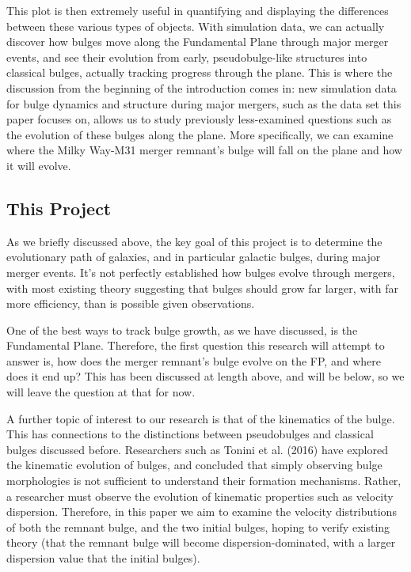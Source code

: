 \documentclass[iop]{emulateapj}
\begin{document}
This plot is then extremely useful in quantifying and displaying the differences between these various types of objects. With simulation data, we can actually discover how bulges move along the Fundamental Plane through major merger events, and see their evolution from early, pseudobulge-like structures into classical bulges, actually tracking progress through the plane. This is where the discussion from the beginning of the introduction comes in: new simulation data for bulge dynamics and structure during major mergers, such as the data set this paper focuses on, allows us to study previously less-examined questions such as the evolution of these bulges along the plane. More specifically, we can examine where the Milky Way-M31 merger remnant's bulge will fall on the plane and how it will evolve. 

\subsection{This Project}

As we briefly discussed above, the key goal of this project is to determine the evolutionary path of galaxies, and in particular galactic bulges, during major merger events. It's not perfectly established how bulges evolve through mergers, with most existing theory suggesting that bulges should grow far larger, with far more efficiency, than is possible given observations. 

\vspace*{5 mm}

One of the best ways to track bulge growth, as we have discussed, is the Fundamental Plane. Therefore, the first question this research will attempt to answer is, how does the merger remnant's bulge evolve on the FP, and where does it end up? This has been discussed at length above, and will be below, so we will leave the question at that for now.

A further topic of interest to our research is that of the kinematics of the bulge. This has connections to the distinctions between pseudobulges and classical bulges discussed before. Researchers such as Tonini et al. (2016) have explored the kinematic evolution of bulges, and concluded that simply observing bulge morphologies is not sufficient to understand their formation mechanisms. Rather, a researcher must observe the evolution of kinematic properties such as velocity dispersion. Therefore, in this paper we aim to examine the velocity distributions of both the remnant bulge, and the two initial bulges, hoping to verify existing theory (that the remnant bulge will become dispersion-dominated, with a larger dispersion value that the initial bulges).
\end{document}
